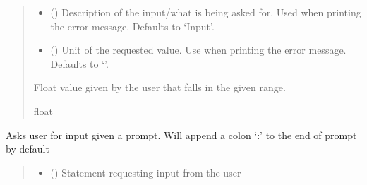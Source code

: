 \documentclass[letterpaper,10pt,english]{sphinxmanual}
\begin{document}
\begin{fulllineitems}
\begin{fulllineitems}
\begin{quote}
\begin{description}
\begin{itemize}
\item {} 
\sphinxAtStartPar
{} (\sphinxstyleliteralemphasis{\sphinxupquote{, }}) \textendash{} Description of the input/what is being asked for. Used when printing                 the error message. Defaults to ‘Input’.

\item {} 
\sphinxAtStartPar
{} (\sphinxstyleliteralemphasis{\sphinxupquote{, }}) \textendash{} Unit of the requested value. Use when printing the error message.                 Defaults to ‘’.

\end{itemize}

\sphinxAtStartPar
Float value given by the user that falls in the given range.

\sphinxAtStartPar
float

\end{description}\end{quote}

\end{fulllineitems}


\begin{fulllineitems}
\label{\detokenize{Setup.Inputs:Setup.Inputs.GetUserInput.UserInput.AskForInput}}
\pysigstartsignatures
{}
\pysigstopsignatures
\sphinxAtStartPar
Asks user for input given a prompt. Will append a colon ‘:’ to the end of prompt by default
\begin{quote}\begin{description}
\begin{itemize}
\item {} 
\sphinxAtStartPar
{} () \textendash{} Statement requesting input from the user


\end{itemize}
\end{description}
\end{quote}
\end{fulllineitems}
\end{fulllineitems}
\end{document}
